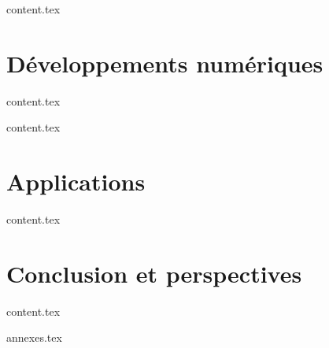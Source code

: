 \documentclass{bredele}
\begin{document}
\clearemptydoublepage
{content.tex}

\part{Développements numériques}

\clearemptydoublepage
{content.tex}


\clearemptydoublepage
{content.tex}

\part{Applications}

\clearemptydoublepage
{content.tex}


\part{Conclusion et perspectives}


\clearemptydoublepage
{content.tex}



\frontmatter
\clearemptydoublepage
{annexes.tex}



\clearemptydoublepage
\backmatter
\printbibliography
\end{document}
